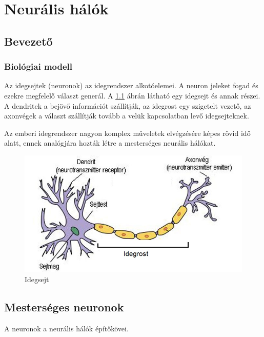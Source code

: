 \chapter{Neurális hálók}\label{ch:INTRO}
\section{Bevezető}
\subsection{Biológiai modell}

Az idegsejtek (neuronok) az idegrendszer alkotóelemei. A neuron jeleket fogad és ezekre megfelelő választ generál. A \ref{fig:idegsejt} ábrán látható egy idegsejt és annak részei. A dendritek a bejövő információt szállítják, az idegrost egy szigetelt vezető, az axonvégek a választ szállítják tovább a velük kapcsolatban levő idegsejteknek. 

Az emberi idegrendszer nagyon komplex műveletek elvégzésére képes rövid idő alatt, ennek analógjára hozták létre a mesterséges neurális hálókat.

\begin{figure}[h]
\centering

\includegraphics[scale=0.5]{images/idegsejt}
\caption{Idegsejt}

\label{fig:idegsejt}
\end{figure}


\section{Mesterséges neuronok}\label{sec:INTRO:neurons}
A neuronok a neurális hálók építőkövei.
